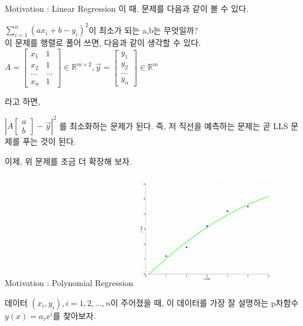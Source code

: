 \documentclass{beamer}
\begin{document}
\begin{frame}[allowframebreaks]{Motivation : Linear Regression} 
이 때, 문제를 다음과 같이 볼 수 있다. \\  
\vspace{5mm}

$\sum^n_{i=1} (ax_i + b - y_i)^2 $이 최소가 되는 a,b는 무엇일까? \\ 

\vspace{5mm}
이 문제를 행렬로 풀어 쓰면, 다음과 같이 생각할 수 있다. 
\framebreak
$ A = \left[ \begin{matrix} 
x_1 & 1 \\
x_2 & 1 \\ 
... & ... \\
x_n & 1 \end{matrix} \right] \in \mathds{R}^{m \times 2}, 
\vec{y} = \left[ \begin{matrix} 
y_1 \\ 
y_2 \\ 
... \\ 
y_n \end{matrix} \right] \in \mathds{R}^{m} $

라고 하면, 

$\left|A \left[ \begin{matrix} a \\ b \end{matrix} \right]  - \vec{y}\right|^2$ 를 최소화하는 문제가 된다. 즉, 저 직선을 예측하는 문제는 곧 LLS 문제를 푸는 것이 된다. 

이제, 위 문제를 조금 더 확장해 보자. 
\end{frame}


\begin{frame}{Motivation : Polynomial Regression} 
\includegraphics[height=5cm,keepaspectratio]{poly}

데이터 $(x_i, y_i), i=1,2,...,n$이 주어졌을 때, 이 데이터를 가장 잘 설명하는 p차함수 $y(x) = a_ix^i$를 찾아보자. 
\end{frame}
\end{document}
